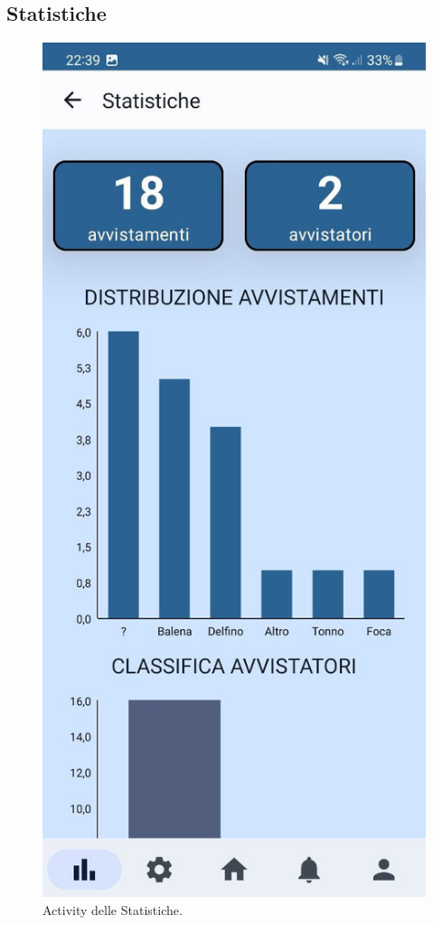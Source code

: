 \documentclass[a4paper,final,12pt]{report}
\begin{document}
\subsection{Statistiche}
\begin{figure}[hbtp]
\centering
\includegraphics[scale=0.20]{img_concettuale/statmob.jpg}
\caption{Activity delle Statistiche.}
\label{figura:actstatsad}
\end{figure}
\end{document}
